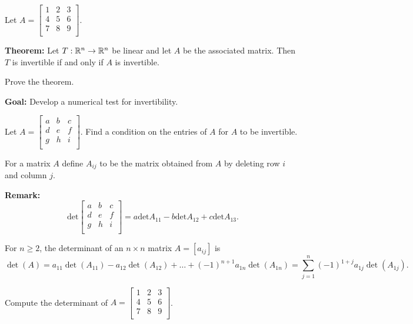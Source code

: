 \begin{enumerate}
\vfill

\Part Let $A=\begin{bmatrix}
1 &2 & 3\\
4 &5 & 6\\
7 & 8 & 9\\
\end{bmatrix}$.

\vfill

\newpage

{\bf Theorem:} Let $T: \mathbb{R}^n \to \mathbb{R}^n$ be linear and let $A$ be the associated matrix. Then $T$ is invertible if and only if $A$ is invertible.

\Problem Prove the theorem.

\newpage

{\bf Goal:} Develop a numerical test for invertibility.

\Problem Let $A=\begin{bmatrix}
a & b & c\\
d & e &f\\
g & h & i\\
\end{bmatrix}$. Find a condition on the entries of $A$ for $A$ to be invertible.

\newpage

\begin{defn}
For a matrix $A$ define  $A_{ij}$ to be the matrix obtained from $A$ by deleting row $i$ and column $j$.
\end{defn}

{\bf Remark:} $$\text{det} \begin{bmatrix}
a & b & c\\
d & e &f\\
g & h & i\\
\end{bmatrix} = a \text{det} A_{11} - b \text{det} A_{12} +c \text{det} A_{13}.$$

\begin{defn}
For $n\geq 2$, the determinant of an $n\times n$ matrix $A=[a_{ij}]$ is
\begin{equation*}
\operatorname{det}(A)= a_{11} \operatorname{det}(A_{11}) - a_{12} \operatorname{det}(A_{12})+\dots + (-1)^{n+1} a_{1n} \operatorname{det}(A_{1n})=\sum_{j=1}^{n}(-1)^{1+j}a_{1j} \operatorname{det}(A_{1j}).
\end{equation*}
\end{defn}

\Problem Compute the determinant of $A=\begin{bmatrix}
1 & 2 &3\\
4 & 5 &6\\
7 & 8 & 9\\
\end{bmatrix}$.


\end{enumerate}

